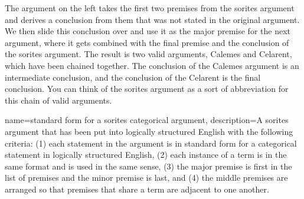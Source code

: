 



The argument on the left takes the first two premises from the sorites argument and derives a conclusion from them that was not stated in the original argument. We then slide this conclusion over and use it as the major premise for the next argument, where it gets combined with the final premise and the conclusion of the sorites argument. The result is two valid arguments, Calemes and Celarent, which have been chained together. The conclusion of the Calemes argument is an intermediate conclusion, and the conclusion of the Celarent is the final conclusion. You can think of the sorites argument as a sort of abbreviation for this chain of valid arguments. 

{
name=standard form for a sorites categorical argument,
description={A sorites argument that has been put into logically structured English with the following criteria: (1) each statement in the argument is in standard form for a categorical statement in logically structured English, (2) each instance of a term is in the same format and is used in the same sense, (3) the major premise is first in the list of premises and the minor premise is last, and (4) the middle premises are arranged so that premises that share a term are adjacent to one another.}
}

